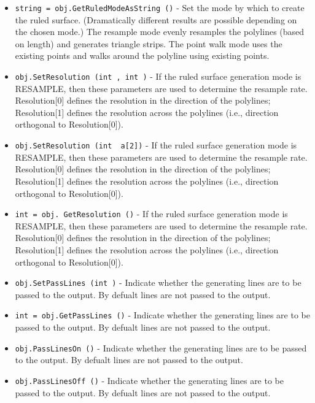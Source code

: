 \begin{itemize}
\item  \verb|string = obj.GetRuledModeAsString ()| -  Set the mode by which to create the ruled surface. (Dramatically
 different results are possible depending on the chosen mode.) The
 resample mode evenly resamples the polylines (based on length) and 
 generates triangle strips. The point walk mode uses the existing
 points and walks around the polyline using existing points.

\item  \verb|obj.SetResolution (int , int )| -  If the ruled surface generation mode is RESAMPLE, then these parameters
 are used to determine the resample rate. Resolution[0] defines the
 resolution in the direction of the polylines; Resolution[1] defines
 the resolution across the polylines (i.e., direction orthogonal to
 Resolution[0]).

\item  \verb|obj.SetResolution (int  a[2])| -  If the ruled surface generation mode is RESAMPLE, then these parameters
 are used to determine the resample rate. Resolution[0] defines the
 resolution in the direction of the polylines; Resolution[1] defines
 the resolution across the polylines (i.e., direction orthogonal to
 Resolution[0]).

\item  \verb|int = obj. GetResolution ()| -  If the ruled surface generation mode is RESAMPLE, then these parameters
 are used to determine the resample rate. Resolution[0] defines the
 resolution in the direction of the polylines; Resolution[1] defines
 the resolution across the polylines (i.e., direction orthogonal to
 Resolution[0]).

\item  \verb|obj.SetPassLines (int )| -  Indicate whether the generating lines are to be passed to the output.
 By defualt lines are not passed to the output.

\item  \verb|int = obj.GetPassLines ()| -  Indicate whether the generating lines are to be passed to the output.
 By defualt lines are not passed to the output.

\item  \verb|obj.PassLinesOn ()| -  Indicate whether the generating lines are to be passed to the output.
 By defualt lines are not passed to the output.

\item  \verb|obj.PassLinesOff ()| -  Indicate whether the generating lines are to be passed to the output.
 By defualt lines are not passed to the output.


\end{itemize}
